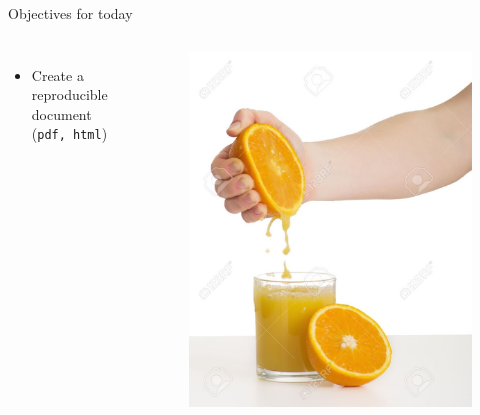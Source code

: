 \documentclass[10pt]{beamer}\usepackage[]{graphicx}\usepackage[]{color}
\newcommand{\code}[1]{\texttt{#1}}
\begin{document}
\begin{frame}{Objectives for today}
\begin{columns}[c] %


\begin{itemize}
\item Create a reproducible document (\code{pdf, html})
\end{itemize}
\pause 
{} %
\begin{figure}
\includegraphics[width=0.8\columnwidth]{./juice}
\end{figure}

\end{columns}
\end{frame}
\end{document}
